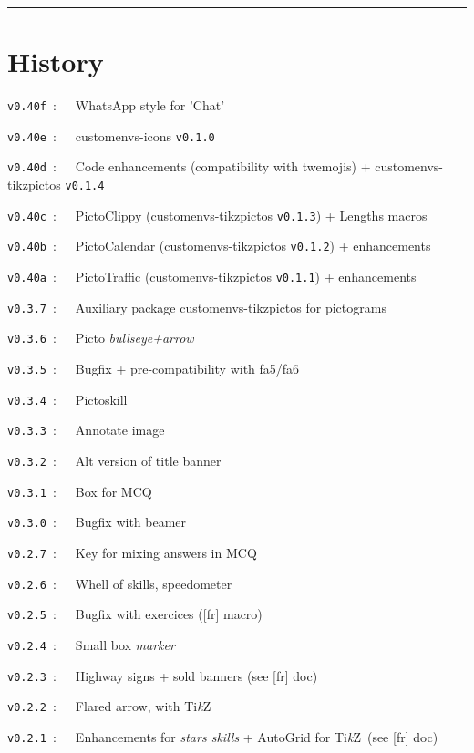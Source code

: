 \documentclass[english,11pt,a4paper]{article}
\providecommand\tikzlogo{Ti\textit{k}Z}
\let\TikZ\tikzlogo
\begin{document}
\tableofcontents

\vspace*{5mm}

\hrule

\vfill

\section{History}

\verb|v0.40f|~:~~~\textsf{WhatsApp} style for 'Chat'

\verb|v0.40e|~:~~~\textsf{customenvs-icons} \texttt{v0.1.0}

\verb|v0.40d|~:~~~Code enhancements (compatibility  with twemojis) + \textsf{customenvs-tikzpictos} \texttt{v0.1.4}

\verb|v0.40c|~:~~~PictoClippy (\textsf{customenvs-tikzpictos} \texttt{v0.1.3}) + Lengths macros

\verb|v0.40b|~:~~~PictoCalendar (\textsf{customenvs-tikzpictos} \texttt{v0.1.2}) + enhancements

\verb|v0.40a|~:~~~PictoTraffic (\textsf{customenvs-tikzpictos} \texttt{v0.1.1}) + enhancements

\verb|v0.3.7|~:~~~Auxiliary package \textsf{customenvs-tikzpictos} for pictograms

\verb|v0.3.6|~:~~~Picto \textit{bullseye+arrow}

\verb|v0.3.5|~:~~~Bugfix + pre-compatibility with \textsf{fa5/fa6}

\verb|v0.3.4|~:~~~Pictoskill

\verb|v0.3.3|~:~~~Annotate image

\verb|v0.3.2|~:~~~Alt version of title banner

\verb|v0.3.1|~:~~~Box for MCQ

\verb|v0.3.0|~:~~~Bugfix with \textsf{beamer}

\verb|v0.2.7|~:~~~Key for mixing answers in MCQ

\verb|v0.2.6|~:~~~Whell of skills, speedometer

\verb|v0.2.5|~:~~~Bugfix with exercices (\textsf{[fr]} macro)

\verb|v0.2.4|~:~~~Small box \textit{marker}

\verb|v0.2.3|~:~~~Highway signs + sold banners (see \textsf{[fr]} doc)

\verb|v0.2.2|~:~~~Flared arrow, with \TikZ

\verb|v0.2.1|~:~~~Enhancements for \textit{stars skills} + AutoGrid for \TikZ\ (see \textsf{[fr]} doc)
\end{document}
